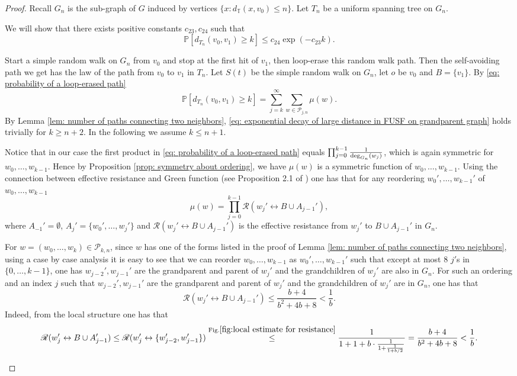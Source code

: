 \documentclass[12pt]{article}
\numberwithin{equation}{section}
\newcommand{\be}{\begin{equation}}
\newcommand{\ee}{\end{equation}}
\newcommand{\1}{\mathbf{1}}
\begin{document}
\begin{proof}
	Recall $G_n$ is the sub-graph of $G$  induced by vertices $\{x:d_{\mathbb{T}}(x,v_0)\leq n \}$. Let $T_n$ be a uniform spanning tree on $G_n$. 
	

	We will show that there exists positive constants $c_{23},c_{24}$ such that
	\be\label{eq: exponential decay of large distance in FUSF on grandparent graph}
	\mathbb{P}[d_{{T}_n}(v_0,v_1)\geq k]\leq  c_{24}\exp{(-c_{23}k)}.
	\ee
	
	Start a simple random walk on $G_n$ from $v_0$ and stop at the first hit of $v_1$, then loop-erase this random walk path. Then the self-avoiding path we get has the law of the path from $v_0$ to $v_1$ in $T_n$. Let $S(t)$ be the simple random walk on $G_n$, let $o$ be $v_0$ and $B=\{v_1\}$. By \eqref{eq: probability of a loop-erased path}
	\be\label{eq: 5.3-tail prob for large distance in FUSF on grandparent graph}
	\mathbb{P}[d_{{T}_n}(v_0,v_1)\geq k]= \sum_{j=k}^{\infty}\sum_{w\in \mathscr{P}_{j,n}}{\mu (w)}. 
	\ee
	By Lemma \ref{lem: number of paths connecting two neighbors}, \eqref{eq: exponential decay of large distance in FUSF on grandparent graph} holds trivially for $k\geq n+2$. In the following we assume $k\leq n+1$.
	
	
	Notice that in our case the first product in \eqref{eq: probability of a loop-erased path} equals $\prod_{j=0}^{k-1}\frac{1}{\textnormal{deg}_{G_n}(w_j)}$, which is again symmetric for $w_0,\ldots,w_{k-1}$. Hence by Proposition \ref{prop: symmetry about ordering}, we have $\mu(w)$ is a symmetric function of $w_0,\ldots,w_{k-1}$. Using the connection between effective resistance and Green function (see Proposition 2.1 of \cite{LP2016}) one has that 
	for any reordering $w_0',\ldots,w_{k-1}'$ of $w_0,\ldots,w_{k-1}$ 
	\be\label{eq: probability of a self-avoiding path in terms of resistance}
	\mu(w)=\prod_{j=0}^{k-1}\mathscr{R}(w_j'\leftrightarrow B\cup A_{j-1}'),
	\ee
	where $A_{-1}'=\emptyset$, $A_j'=\{w_0',\ldots,w_j'\}$ and $\mathscr{R}(w_j'\leftrightarrow B\cup A_{j-1}')$ is the effective resistance from $w_j'$ to $B\cup A_{j-1}'$ in $G_n$. 
	
	
For $w=(w_0,\ldots,w_k)\in\mathscr{P}_{k,n} $, since $w$ has one of the forms listed in the proof of Lemma \ref{lem: number of paths connecting two neighbors}, using a case by case analysis it is easy to see that we can reorder $w_0,\ldots,w_{k-1}$ as $w_0',\ldots,w_{k-1}'$ such that except at most $8$ $j'$s in $\{0,\ldots,k-1\}$, one has $w_{j-2}',w_{j-1}'$ are the grandparent and parent of $w_j'$ and the grandchildren of $w_j'$ are also in $G_n$. For such an ordering and an index $j$ such that $w_{j-2}',w_{j-1}'$ are the grandparent and parent of $w_j'$ and the grandchildren of $w_j'$ are in $G_n$, one has that 
\[
\mathscr{R}(w_j'\leftrightarrow B\cup A_{j-1}')\leq \frac{b+4}{b^2+4b+8}<\frac{1}{b}.
\]
Indeed, from the local structure one has that 
\[
\mathscr{R}(w_j'\leftrightarrow B\cup A_{j-1}')\leq 
\mathscr{R}(w_j'\leftrightarrow \{w_{j-2}',w_{j-1}'\})\stackrel{\textnormal{Fig.}\ref{fig:local estimate for resistance}}{\leq} 
\frac{1}{1+1+b\cdot\frac{1}{1+\frac{1}{1+b/2}} }=\frac{b+4}{b^2+4b+8}<\frac{1}{b}.
\]
\begin{figure}[h!]
	

\end{figure}
\end{proof}
\end{document}
